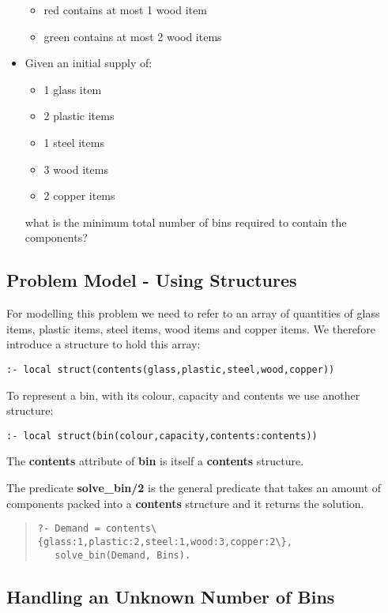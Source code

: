 \begin{itemize}
\begin{itemize}
\item red   contains at most 1 wood item
\item green contains at most 2 wood items
\end{itemize}

\item Given an initial supply of:
\begin{itemize}
\item 1 glass item
\item 2 plastic items
\item 1 steel items
\item 3 wood items
\item 2 copper items
\end{itemize}
what is the minimum total number of bins required to
contain the components?
\end{itemize}

\subsection{Problem Model - Using Structures}

For modelling this problem we need to refer to an array of quantities
of glass items, plastic items, steel items, wood items and copper
items.
We therefore introduce a structure to hold this array:
\begin{verbatim}
:- local struct(contents(glass,plastic,steel,wood,copper))
\end{verbatim}

To represent a bin, with its colour, capacity and contents we use
another structure:
\begin{verbatim}
:- local struct(bin(colour,capacity,contents:contents))
\end{verbatim}
The {\bf contents} attribute of {\bf bin} is itself a {\bf contents}
structure. 

The predicate {\bf solve_bin/2} is the general predicate
that takes an amount of components packed into a {\bf contents}
structure and it returns the solution.
\begin{quote}
\begin{verbatim}
?- Demand = contents\{glass:1,plastic:2,steel:1,wood:3,copper:2\},
   solve_bin(Demand, Bins).
\end{verbatim}
\end{quote}

\subsection{ Handling an Unknown Number of Bins}

